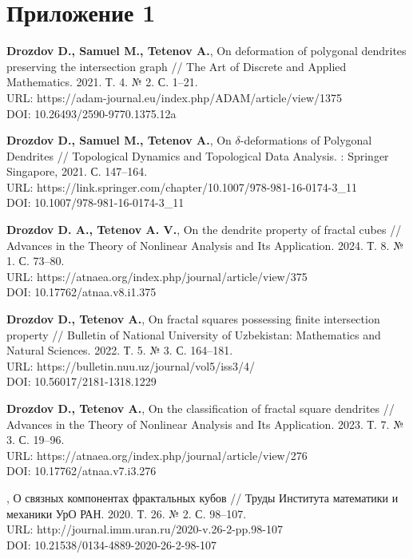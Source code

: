\documentclass[a4paper,14pt,twoside]{extarticle} %
\begin{document}
\thispagestyle{empty}

\section*{Приложение 1}


\begin{thebibliography}{9}

{\bf Drozdov D., Samuel M., Tetenov A.},
On deformation of polygonal dendrites preserving the intersection graph //
The Art of Discrete and Applied Mathematics. 2021. Т. 4. № 2. С. 1--21.\\
URL: https://adam-journal.eu/index.php/ADAM/article/view/1375\\
DOI: 10.26493/2590-9770.1375.12a

{\bf Drozdov D., Samuel M., Tetenov A.},
On $\delta$-deformations of Polygonal Dendrites //
Topological Dynamics and Topological Data Analysis. : Springer Singapore, 2021. С. 147--164.\\
URL: https://link.springer.com/chapter/10.1007/978-981-16-0174-3\_11\\
DOI: 10.1007/978-981-16-0174-3\_11

{\bf Drozdov D. A., Tetenov A. V.}, On the dendrite property of fractal cubes // Advances in the Theory of Nonlinear Analysis and Its Application. 2024. Т. 8. № 1. С. 73--80.\\
URL: https://atnaea.org/index.php/journal/article/view/375\\
DOI: 10.17762/atnaa.v8.i1.375

{\bf Drozdov D., Tetenov A.},
On fractal squares possessing finite intersection property //
Bulletin of National University of Uzbekistan: Mathematics and Natural Sciences. 2022. Т. 5. № 3. С. 164--181.\\
URL: https://bulletin.nuu.uz/journal/vol5/iss3/4/\\
DOI: 10.56017/2181-1318.1229

{\bf Drozdov D., Tetenov A.},
On the classification of fractal square dendrites //
Advances in the Theory of Nonlinear Analysis and Its Application. 2023. Т. 7. № 3. С. 19--96.\\
URL: https://atnaea.org/index.php/journal/article/view/276\\
DOI: 10.17762/atnaa.v7.i3.276

,
О связных компонентах фрактальных кубов //
Труды Института математики и механики УрО РАН. 2020. Т. 26. № 2. С. 98--107.\\
URL: http://journal.imm.uran.ru/2020-v.26-2-pp.98-107\\
DOI: 10.21538/0134-4889-2020-26-2-98-107


\end{thebibliography}
\end{document}
